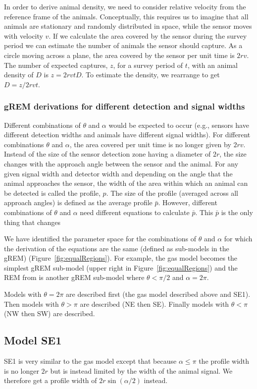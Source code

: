 In order to derive animal density, we need to consider relative velocity from the reference frame of the animals.
Conceptually, this requires us to imagine that all animals are stationary and randomly distributed in space, while the sensor moves with velocity $v$.
If we calculate the area covered by the sensor during the survey period we can estimate the number of animals the sensor should capture.
As a circle moving across a plane, the area covered by the sensor per unit time is $2rv$.
The number of expected captures, $z$, for a survey period of $t$, with an animal density of $D$ is $z = 2rvtD$.
To estimate the density, we rearrange to get $D = z/2rvt$.

\subsubsection{gREM derivations for different detection and signal widths}
Different combinations of $\theta$ and $\alpha$ would be expected to occur (e.g., sensors have different detection widths and animals have different signal widths).
For different combinations $\theta$ and $\alpha$, the area covered per unit time is no longer given by $2rv$.
Instead of the size of the sensor detection zone having a diameter of $2r$, the size changes with the approach angle between the sensor and the animal.
For any given signal width and detector width and depending on the angle that the animal approaches the sensor, the width of the area within which an animal can be detected is called the profile, $p$.
The size of the profile (averaged across all approach angles) is defined as the average profile $\bar{p}$.
However, different combinations of $\theta$ and $\alpha$ need different equations to calculate $\bar{p}$.
This $\bar{p}$ is the only thing that changes 

We have identified the parameter space for the combinations of $\theta$ and $\alpha$ for which the derivation of the equations are the same (defined as sub-models in the gREM) (Figure~\ref{fig:equalRegions}).
For example, the gas model becomes the simplest gREM sub-model (upper right in Figure~\ref{fig:equalRegions}) and the REM from \cite{rowcliffe2008estimating} is another gREM sub-model where $\theta<\pi/2$ and $\alpha = 2\pi$.

Models with $\theta = 2\pi$ are described first (the gas model described above and SE1).
Then models with $\theta > \pi$ are described (NE then SE).
Finally models with $\theta < \pi$ (NW then SW) are described.

\subsection{Model SE1} \label{SE1}
SE1 is very similar to the gas model except that because $\alpha \le \pi$ the profile width is no longer $2r$ but is instead limited by the width of the animal signal.
We therefore get a profile width of $2r\sin(\alpha/2)$ instead.

